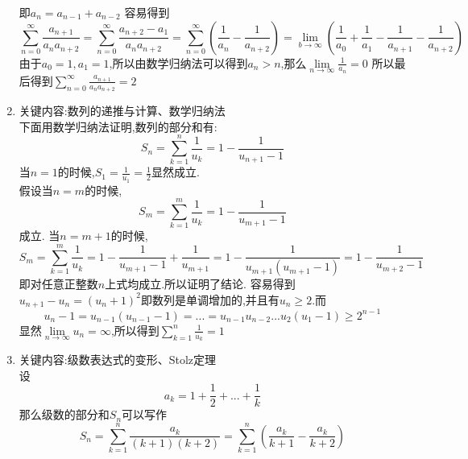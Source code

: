 \documentclass[UTF8,a4paper,10pt]{ctexart}
\begin{document}
\begin{flushleft}
\begin{enumerate}
			即$a_{n}=a_{n-1}+a_{n-2}$
			容易得到
			\begin{equation}
				\sum\limits_{n=0}^{\infty}\frac{a_{n+1}}{a_{n}a_{n+2}}=\sum\limits_{n=0}^{\infty}\frac{a_{n+2}-a_{1}}{a_{n}a_{n+2}}=\sum\limits_{n=0}^{\infty}(\frac{1}{a_{n}}-\frac{1}{a_{n+2}})=\lim\limits_{b\rightarrow\infty}(\frac{1}{a_{0}}+\frac{1}{a_{1}}-\frac{1}{a_{n+1}}-\frac{1}{a_{n+2}})\nonumber
			\end{equation}
			由于$a_{0}=1,a_{1}=1$,所以由数学归纳法可以得到$a_{n}>n$,那么$\lim\limits_{n\rightarrow\infty}\frac{1}{a_{n}}=0$
			所以最后得到$\sum\limits_{n=0}^{\infty}\frac{a_{n+1}}{a_{n}a_{n+2}}=2$
			\item 关键内容:数列的递推与计算、数学归纳法\\
			下面用数学归纳法证明,数列的部分和有:
			\begin{equation}
				S_{n}=\sum\limits_{k=1}^{n}\frac{1}{u_{k}}=1-\frac{1}{u_{n+1}-1}\nonumber
			\end{equation}
			当$n=1$的时候,$S_{1}=\frac{1}{u_{1}}=\frac{1}{2}$显然成立.\\
			假设当$n=m$的时候,
			\begin{equation}
				S_{m}=\sum\limits_{k=1}^{m}\frac{1}{u_{k}}=1-\frac{1}{u_{m+1}-1}\nonumber
			\end{equation}
			成立.
			当$n=m+1$的时候,
			\begin{equation}
				S_{m}=\sum\limits_{k=1}^{m}\frac{1}{u_{k}}=1-\frac{1}{u_{m+1}-1}+\frac{1}{u_{m+1}}=1-\frac{1}{u_{m+1}(u_{m+1}-1)}=1-\frac{1}{u_{m+2}-1}\nonumber
			\end{equation}
			即对任意正整数$n$上式均成立.所以证明了结论.
			容易得到$u_{n+1}-u_{n}=(u_{n}+1)^{2}$即数列是单调增加的,并且有$u_{n}\geq{2}$.而
			\begin{equation}
				u_{n}-1=u_{n-1}(u_{n-1}-1)=...=u_{n-1}u_{n-2}...u_{2}(u_{1}-1)\geq{2^{n-1}}
			\end{equation}
			显然$\lim\limits_{n\rightarrow\infty}u_{n}=\infty$,所以得到$\sum\limits_{k=1}^{n}\frac{1}{u_{k}}=1$
			\item 关键内容:级数表达式的变形、Stolz定理\\
			设
			\begin{equation}
				a_{k}=1+\frac{1}{2}+...+\frac{1}{k}\nonumber
			\end{equation}
			那么级数的部分和$S_{n}$可以写作
				\begin{equation}
					S_{n}=\sum\limits_{k=1}^{n}\frac{a_{k}}{(k+1)(k+2)}=\sum\limits_{k=1}^{n}(\frac{a_{k}}{k+1}-\frac{a_{k}}{k+2})\nonumber
				\end{equation}

\end{enumerate}
\end{flushleft}
\end{document}

